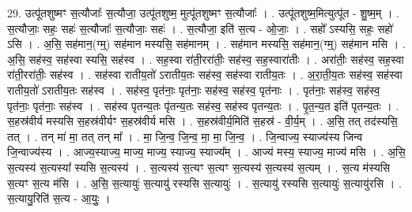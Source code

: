 \documentclass[17pt]{extarticle}
\begin{document}
29. उत्पू॑तशुष्मꣳ स॒त्यौजाः᳚ स॒त्यौजा॒ उत्पू॑तशुष्म॒ मुत्पू॑तशुष्मꣳ स॒त्यौजाः᳚ । . उत्पू॑तशुष्म॒मित्युत्पू॑त - शु॒ष्म॒म् । . स॒त्यौजाः॒ सहः॒ सहः॑ स॒त्यौजाः᳚ स॒त्यौजाः॒ सहः॑ । . स॒त्यौजा॒ इति॑ स॒त्य - ओ॒जाः॒ । . सहो᳚ ऽस्यसि॒ सहः॒ सहो॑ ऽसि । . अ॒सि॒ सह॑मान॒(ग्म्॒) सह॑मान मस्यसि॒ सह॑मानम् । . सह॑मान मस्यसि॒ सह॑मान॒(ग्म्॒) सह॑मान मसि । . अ॒सि॒ सह॑स्व॒ सह॑स्वा स्यसि॒ सह॑स्व । . सह॒स्वा रा॑ती॒ररा॑तीः॒ सह॑स्व॒ सह॒स्वारा॑तीः । . अरा॑तीः॒ सह॑स्व॒ सह॒स्वा रा॑ती॒ररा॑तीः॒ सह॑स्व । . सह॑स्वा रातीय॒तो॑ ऽरातीय॒तः सह॑स्व॒ सह॑स्वा रातीय॒तः । . अ॒रा॒ती॒य॒तः सह॑स्व॒ सह॑स्वा रातीय॒तो॑ ऽरातीय॒तः सह॑स्व । . सह॑स्व॒ पृत॑नाः॒ पृत॑नाः॒ सह॑स्व॒ सह॑स्व॒ पृत॑नाः । . पृत॑नाः॒ सह॑स्व॒ सह॑स्व॒ पृत॑नाः॒ पृत॑नाः॒ सह॑स्व । . सह॑स्व पृतन्य॒तः पृ॑तन्य॒तः सह॑स्व॒ सह॑स्व पृतन्य॒तः । . पृ॒त॒न्य॒त इति॑ पृतन्य॒तः । . स॒हस्र॑वीर्य मस्यसि स॒हस्र॑वीर्यꣳ स॒हस्र॑वीर्य मसि । . स॒हस्र॑वीर्य॒मिति॑ स॒हस्र॑ - वी॒र्य॒म् । . अ॒सि॒ तत् तद॑स्यसि॒ तत् । . तन् मा॑ मा॒ तत् तन् मा᳚ । . मा॒ जि॒न्व॒ जि॒न्व॒ मा॒ मा॒ जि॒न्व॒ । . जि॒न्वाज्य॒ स्याज्य॑स्य जिन्व जि॒न्वाज्य॑स्य । . आज्य॒स्याज्य॒ माज्य॒ माज्य॒ स्याज्य॒ स्याज्य᳚म् । . आज्य॑ मस्य॒ स्याज्य॒ माज्य॑ मसि । . अ॒सि॒ स॒त्यस्य॑ स॒त्यस्या᳚ स्यसि स॒त्यस्य॑ । . स॒त्यस्य॑ स॒त्यꣳ स॒त्यꣳ स॒त्यस्य॑ स॒त्यस्य॑ स॒त्यम् । . स॒त्य म॑स्यसि स॒त्यꣳ स॒त्य म॑सि । . अ॒सि॒ स॒त्यायुः॑ स॒त्यायु॑ रस्यसि स॒त्यायुः॑ । . स॒त्यायु॑ रस्यसि स॒त्यायुः॑ स॒त्यायु॑रसि । . स॒त्यायु॒रिति॑ स॒त्य - आ॒युः॒ । \newline
\end{document}
